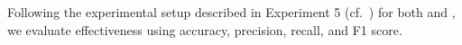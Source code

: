Following the experimental setup described in Experiment 5 (cf.~) for both \impAppr{} and \unmasking{}, we evaluate effectiveness using accuracy, precision, recall, and F1 score.



